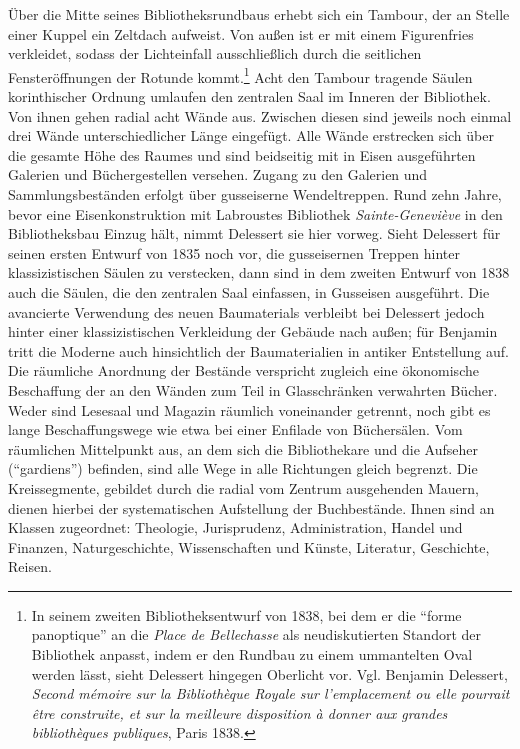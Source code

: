 Über die Mitte seines Bibliotheksrundbaus erhebt sich ein Tambour, der
an Stelle einer Kuppel ein Zeltdach aufweist. Von außen ist er mit einem
Figurenfries verkleidet, sodass der Lichteinfall ausschließlich durch
die seitlichen Fensteröffnungen der Rotunde kommt.\footnote{In seinem
  zweiten Bibliotheksentwurf von 1838, bei dem er die \enquote{forme
  panoptique} an die \emph{Place de Bellechasse} als neudiskutierten
  Standort der Bibliothek anpasst, indem er den Rundbau zu einem
  ummantelten Oval werden lässt, sieht Delessert hingegen Oberlicht vor.
  Vgl. Benjamin Delessert, \emph{Second mémoire sur la Bibliothèque
  Royale sur l'emplacement ou elle pourrait être construite, et sur la
  meilleure disposition à donner aux grandes bibliothèques publiques},
  Paris 1838.} Acht den Tambour tragende Säulen korinthischer Ordnung
umlaufen den zentralen Saal im Inneren der Bibliothek. Von ihnen gehen
radial acht Wände aus. Zwischen diesen sind jeweils noch einmal drei
Wände unterschiedlicher Länge eingefügt. Alle Wände erstrecken sich über
die gesamte Höhe des Raumes und sind beidseitig mit in Eisen
ausgeführten Galerien und Büchergestellen versehen. Zugang zu den
Galerien und Sammlungsbeständen erfolgt über gusseiserne Wendeltreppen.
Rund zehn Jahre, bevor eine Eisenkonstruktion mit Labroustes Bibliothek
\emph{Sainte-Geneviève} in den Bibliotheksbau Einzug hält, nimmt
Delessert sie hier vorweg. Sieht Delessert für seinen ersten Entwurf von
1835 noch vor, die gusseisernen Treppen hinter klassizistischen Säulen
zu verstecken, dann sind in dem zweiten Entwurf von 1838 auch die
Säulen, die den zentralen Saal einfassen, in Gusseisen ausgeführt. Die
avancierte Verwendung des neuen Baumaterials verbleibt bei Delessert
jedoch hinter einer klassizistischen Verkleidung der Gebäude nach außen;
für Benjamin tritt die Moderne auch hinsichtlich der Baumaterialien in
antiker Entstellung auf. Die räumliche Anordnung der Bestände verspricht
zugleich eine ökonomische Beschaffung der an den Wänden zum Teil in
Glasschränken verwahrten Bücher. Weder sind Lesesaal und Magazin
räumlich voneinander getrennt, noch gibt es lange Beschaffungswege wie
etwa bei einer Enfilade von Büchersälen. Vom räumlichen Mittelpunkt aus,
an dem sich die Bibliothekare und die Aufseher (\enquote{gardiens})
befinden, sind alle Wege in alle Richtungen gleich begrenzt. Die
Kreissegmente, gebildet durch die radial vom Zentrum ausgehenden Mauern,
dienen hierbei der systematischen Aufstellung der Buchbestände. Ihnen
sind an Klassen zugeordnet: Theologie, Jurisprudenz, Administration,
Handel und Finanzen, Naturgeschichte, Wissenschaften und Künste,
Literatur, Geschichte, Reisen.


